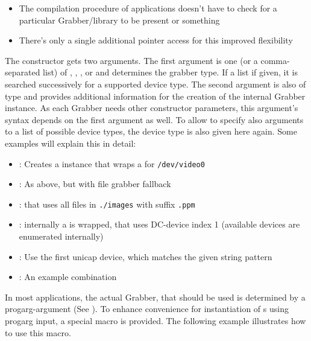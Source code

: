 \begin{enumerate}
\begin{itemize}
\item The compilation procedure of applications doesn't have to check for a particular Grabber/library to be present or something
\item There's only a single additional pointer access for this improved flexibility
\end{itemize}
The  constructor gets two arguments. The first argument is one (or a comma-separated list) of , , ,  or   and determines the grabber type. If a list if given, it is searched successively for a supported device type. The second argument is also of type  and provides additional information for the creation of the internal Grabber instance. As each Grabber needs other constructor parameters, this argument's syntax depends on the first argument as well. To allow to specify also arguments to a list of possible device types, the device type is also given here again. Some examples will explain this in detail:
\begin{itemize}
\item {}: Creates a  instance that wraps a  for \texttt{/dev/video0}
\item {}: As above, but with file grabber fallback
\item {}:  that uses all files in \texttt{./images} with suffix \texttt{.ppm}
\item {}: internally a  is wrapped, that uses DC-device index 1 (available devices are enumerated internally)
\item {}: Use the first unicap device, which matches the given string pattern
\item {}: An example combination
\end{itemize}
In most applications, the actual Grabber, that should be used is determined by a progarg-argument (See ). To enhance convenience for instantiation of  s using progarg input, a special macro  is provided. The following example illustrates how to use this macro. 


\end{enumerate}
